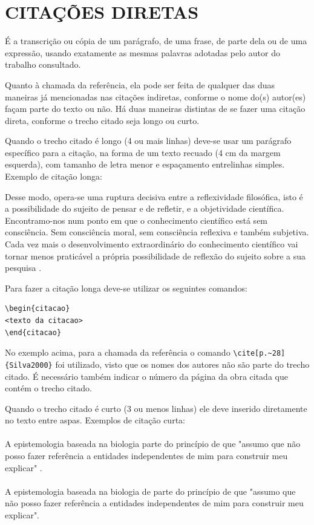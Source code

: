 \chapter{CITAÇÕES DIRETAS}
\label{chap:citacoesLiterais}

É a transcrição ou cópia de um parágrafo, de uma frase, de parte dela ou de uma expressão, usando exatamente as mesmas palavras adotadas pelo autor do trabalho consultado.

Quanto à chamada da referência, ela pode ser feita de qualquer das duas maneiras já mencionadas nas citações indiretas, conforme o nome do(s) autor(es) façam parte do texto ou não. Há duas maneiras distintas de se fazer uma citação direta, conforme o trecho citado seja longo ou curto.

Quando o trecho citado é longo (4 ou mais linhas) deve-se usar um parágrafo específico para a citação, na forma de um texto recuado (4 cm da margem esquerda), com tamanho de letra menor e espaçamento entrelinhas simples. Exemplo de citação longa:
\\\begin{citacao}
    Desse modo, opera-se uma ruptura decisiva entre a reflexividade filosófica, isto é a possibilidade do sujeito de pensar e de refletir, e a objetividade científica. Encontramo-nos num ponto em que o conhecimento científico está sem consciência. Sem consciência moral, sem consciência reflexiva e também subjetiva. Cada vez mais o desenvolvimento extraordinário do conhecimento científico vai tornar menos praticável a própria possibilidade de reflexão do sujeito sobre a sua pesquisa \cite[p.~28]{Silva2000}.
\end{citacao}

Para fazer a citação longa deve-se utilizar os seguintes comandos:
\begin{verbatim}
\begin{citacao}
<texto da citacao>
\end{citacao}
\end{verbatim}

No exemplo acima, para a chamada da referência o comando \verb|\cite[p.~28]{Silva2000}| foi utilizado, visto que os nomes dos autores não são parte do trecho citado. É necessário também indicar o número da página da obra citada que contém o trecho citado.

Quando o trecho citado é curto (3 ou menos linhas) ele deve inserido diretamente no texto entre aspas. Exemplos de citação curta:\\
\\A epistemologia baseada na biologia parte do princípio de que "assumo que não posso fazer referência a entidades independentes de mim para construir meu explicar" \cite[p.~35]{Maturana2003}.\\
\\A epistemologia baseada na biologia de  parte do princípio de que "assumo que não posso fazer referência a entidades independentes de mim para construir meu explicar".

